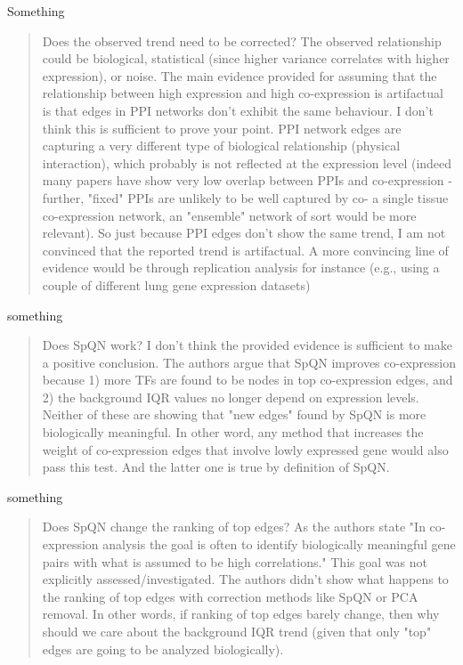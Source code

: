 \documentclass[english,letterpaper,pdftex,12pt]{article}
\begin{document}
\begin{response}
  Something
\end{response}  

\begin{quote}
Does the observed trend need to be corrected? The observed relationship could be biological, statistical (since higher variance correlates with higher expression), or noise. The main evidence provided for assuming that the relationship between high expression and high co-expression is artifactual is that edges in PPI networks don't exhibit the same behaviour. I don't think this is sufficient to prove your point. PPI network edges are capturing a very different type of biological relationship (physical interaction), which probably is not reflected at the expression level (indeed many papers have show very low overlap between PPIs and co-expression - further, "fixed" PPIs are unlikely to be well captured by co- a single tissue co-expression network, an "ensemble" network of sort would be more relevant).  So just because PPI edges don't show the same trend, I am not convinced that the reported trend is artifactual. A more convincing line of evidence would be through replication analysis for instance (e.g., using a couple of different lung gene expression datasets)
\end{quote}

\begin{response}
  something
\end{response}

\begin{quote}
Does SpQN work? I don't think the provided evidence is sufficient to make a positive conclusion. The authors argue that SpQN improves co-expression because 1) more TFs are found to be nodes in top co-expression edges, and 2) the background IQR values no longer depend on expression levels. Neither of these are showing that "new edges" found by SpQN is more biologically meaningful. In other word, any method that increases the weight of co-expression edges that involve lowly expressed gene would also pass this test.  And the latter one is true by definition of SpQN.  
\end{quote}

\begin{response}
  something
\end{response}

\begin{quote}
Does SpQN change the ranking of top edges? As the authors state "In co-expression analysis the goal is often to identify biologically meaningful gene pairs with what is assumed to be high correlations."  This goal was not explicitly assessed/investigated. The authors didn't show what happens to the ranking of top edges with correction methods like SpQN or PCA removal. In other words, if ranking of top edges barely change, then why should we care about the background IQR trend (given that only "top" edges are going to be analyzed biologically).
\end{quote}
\end{document}
